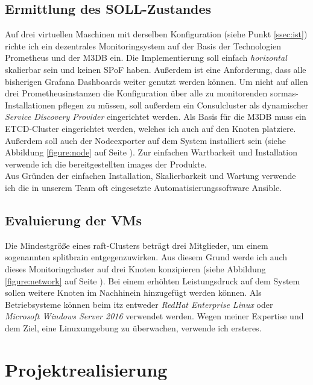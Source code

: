 \documentclass[11pt,a4paper]{article}
\begin{document}
\subsection{Ermittlung des SOLL-Zustandes}
Auf drei virtuellen Maschinen mit derselben Konfiguration (siehe Punkt \ref{ssec:ist}) richte ich ein dezentrales
Monitoringsystem auf der Basis der Technologien Prometheus und der M3DB ein. Die Implementierung
soll einfach \emph{horizontal} skalierbar sein und keinen \gls{SPoF} haben. Außerdem ist eine Anforderung,
dass alle bisherigen Grafana Dashboards weiter genutzt werden können.
Um nicht auf allen drei Prometheusinstanzen die Konfiguration über alle zu monitorenden \gls{sormas}-Installationen
pflegen zu müssen, soll außerdem ein Consulcluster als dynamischer \emph{Service Discovery Provider} eingerichtet werden.
Als Basis für die M3DB muss ein ETCD-Cluster eingerichtet werden, welches ich auch auf den Knoten platziere.
Außerdem soll auch der Nodeexporter auf dem System installiert sein (siehe Abbildung \ref{figure:node} auf Seite \pageref{figure:node}). Zur einfachen Wartbarkeit und Installation
verwende ich die bereitgestellten \gls{images} der Produkte. \\
Aus Gründen der einfachen Installation, Skalierbarkeit und Wartung verwende ich die in unserem Team
oft eingesetzte Automatisierungssoftware Ansible.
\subsection{Evaluierung der VMs}
Die Mindestgröße eines \gls{raft}-Clusters beträgt drei Mitglieder, um einem sogenannten \gls{splitbrain}
entgegenzuwirken. Aus diesem Grund werde ich auch dieses Monitoringcluster auf drei Knoten
konzipieren (siehe Abbildung \ref{figure:network} auf Seite \pageref{figure:network}).
Bei einem erhöhten Leistungsdruck auf dem System sollen weitere Knoten im Nachhinein hinzugefügt werden können.
Als Betriebsysteme können beim \gls{itz} entweder \emph{RedHat Enterprise Linux} oder \emph{Microsoft Windows Server 2016}
verwendet werden. Wegen meiner Expertise und dem Ziel, eine Linuxumgebung zu überwachen, verwende ich ersteres.
\\\noindent{\color[HTML]{FF8C64} \rule{\linewidth}{1mm}}
\section{Projektrealisierung}
\end{document}
